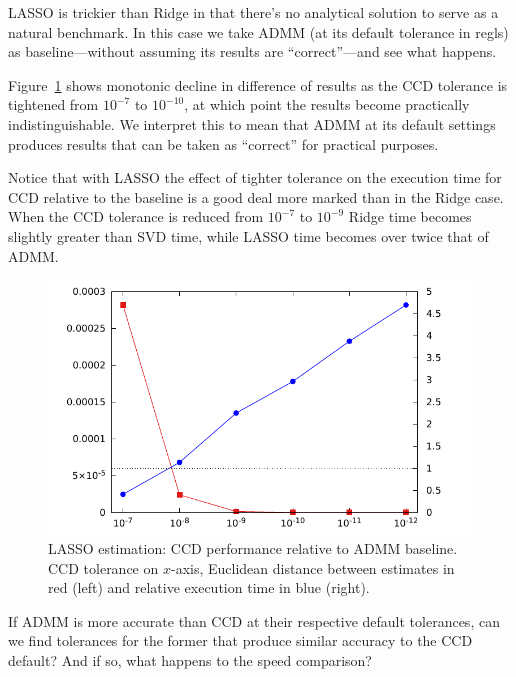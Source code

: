 \documentclass{article}
\begin{document}
LASSO is trickier than Ridge in that there's no analytical solution to
serve as a natural benchmark. In this case we take ADMM (at its
default tolerance in \textsf{regls}) as baseline---without assuming
its results are ``correct''---and see what happens.

Figure~\ref{fig:ccd-admm} shows monotonic decline in difference of
results as the CCD tolerance is tightened from $10^{-7}$ to
$10^{-10}$, at which point the results become practically
indistinguishable. We interpret this to mean that ADMM at its default
settings produces results that can be taken as ``correct'' for
practical purposes.

Notice that with LASSO the effect of tighter tolerance on the
execution time for CCD relative to the baseline is a good deal more
marked than in the Ridge case. When the CCD tolerance is reduced from
$10^{-7}$ to $10^{-9}$ Ridge time becomes slightly greater than SVD
time, while LASSO time becomes over twice that of ADMM.

\begin{figure}[htbp]
\begin{center}
\includegraphics[scale=0.9]{ccd_admm.pdf}
\caption{LASSO estimation: CCD performance relative to ADMM
  baseline. CCD tolerance on $x$-axis, Euclidean distance between
  estimates in red (left) and relative execution time in blue
  (right).}
\label{fig:ccd-admm}
\end{center}
\end{figure}

If ADMM is more accurate than CCD at their respective default
tolerances, can we find tolerances for the former that produce similar
accuracy to the CCD default? And if so, what happens to the speed
comparison?
\end{document}
